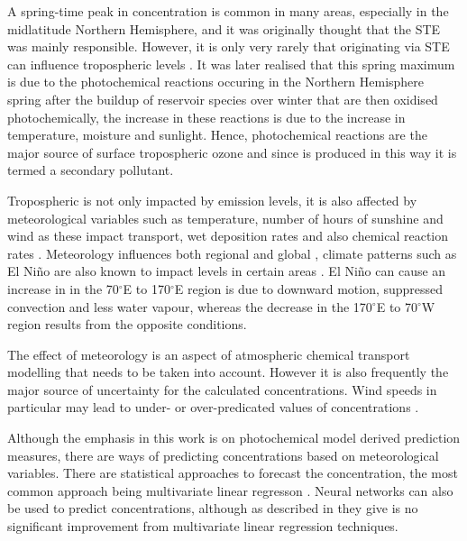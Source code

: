 A spring-time peak in  concentration is common in many areas, especially in the midlatitude Northern Hemisphere, and it 
was originally thought that the STE was mainly responsible. However, it is only very rarely that  originating via STE 
can influence tropospheric  levels \citep{Lelieveld:2000}. It was later realised that this spring maximum is due to the
photochemical reactions occuring in the Northern Hemisphere spring after the buildup of reservoir species over winter 
\citep{Penkett:1986} that are then oxidised photochemically, the increase in these reactions is due to the increase in 
temperature, moisture and sunlight. Hence, photochemical reactions are the major source of surface tropospheric ozone 
\citep{Lelieveld:2000} and since  is produced in this way it is termed a secondary pollutant.

Tropospheric  is not only impacted by emission levels, it is also affected by meteorological variables such as 
temperature, number of hours of sunshine and wind as these impact transport, wet deposition rates and also chemical reaction 
rates \citep{Hess:2009}. Meteorology influences both regional and global  \citep{Hess:2009}, climate patterns such as El 
Ni\~{n}o are also known to impact  levels in certain areas \citep{Sudo:2001}. El Ni\~{n}o can cause an increase in 
 in the 70$^{\circ}$E to 170$^{\circ}$E region is due to downward motion, suppressed convection and less water vapour, 
whereas the  decrease in the 170$^{\circ}$E to 70$^{\circ}$W region results from the opposite conditions.

The effect of meteorology is an aspect of atmospheric chemical transport modelling that needs to be taken into account. However
it is also frequently the major source of uncertainty for the calculated  concentrations. Wind speeds in particular may 
lead to under- or over-predicated values of  concentrations \citep{Sillman:1999}. 

Although the emphasis in this work is on photochemical model derived  prediction measures, there are ways of predicting 
 concentrations based on meteorological variables. There are statistical approaches to forecast the  
concentration, the most common approach being multivariate linear regresson \citep{Comrie:1997}.  Neural networks can also be 
used to predict  concentrations, although as described in \citep{Comrie:1997} they give is no significant improvement 
from multivariate linear regression techniques.

